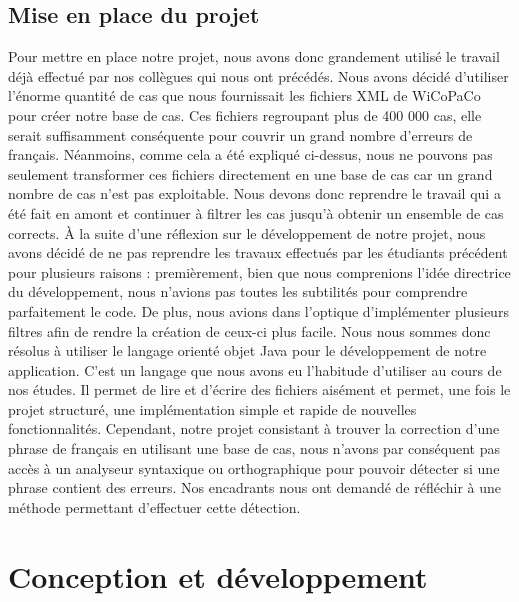 \documentclass{article}
\begin{document}
\subsection{Mise en place du projet}
Pour mettre en place notre projet, nous avons donc grandement utilis\'{e} le travail d\'{e}j\`{a} effectu\'{e} par nos coll\`{e}gues qui nous ont pr\'{e}c\'{e}d\'{e}s. Nous avons d\'{e}cid\'{e} d'utiliser l'\'{e}norme quantit\'{e} de cas que nous fournissait les fichiers XML de WiCoPaCo pour cr\'{e}er notre base de cas. Ces fichiers regroupant plus de 400 000 cas, elle serait suffisamment cons\'{e}quente pour couvrir un grand nombre d'erreurs de fran\c{c}ais. N\'{e}anmoins, comme cela a \'{e}t\'{e} expliqu\'{e} ci-dessus, nous ne pouvons pas seulement transformer ces fichiers directement en une base de cas car un grand nombre de cas n'est pas exploitable. Nous devons donc reprendre le travail qui a \'{e}t\'{e} fait en amont et continuer \`{a} filtrer les cas jusqu'\`{a} obtenir un ensemble de cas corrects.
\newline
\newline
\`{A} la suite d'une r\'{e}flexion sur le d\'{e}veloppement de notre projet, nous avons d\'{e}cid\'{e} de ne pas reprendre les travaux effectu\'{e}s par les \'{e}tudiants pr\'{e}c\'{e}dent pour plusieurs raisons : premi\`{e}rement, bien que nous comprenions l'id\'{e}e directrice du d\'{e}veloppement, nous n'avions pas toutes les subtilit\'{e}s pour comprendre parfaitement le code. De plus, nous avions dans l'optique d'impl\'{e}menter plusieurs filtres afin de rendre la cr\'{e}ation de ceux-ci plus facile. Nous nous sommes donc r\'{e}solus \`{a} utiliser le langage orient\'{e} objet Java pour le d\'{e}veloppement de notre application. C'est un langage que nous avons eu l'habitude d'utiliser au cours de nos \'{e}tudes. Il permet de lire et d'\'{e}crire des fichiers ais\'{e}ment et permet, une fois le projet structur\'{e}, une impl\'{e}mentation simple et rapide de nouvelles fonctionnalit\'{e}s.
\newline
\newline
Cependant, notre projet consistant \`{a} trouver la correction d'une phrase de fran\c{c}ais en utilisant une base de cas, nous n'avons par cons\'{e}quent pas acc\`{e}s \`{a} un analyseur syntaxique ou orthographique pour pouvoir d\'{e}tecter si une phrase contient des erreurs. Nos encadrants nous ont demand\'{e} de r\'{e}fl\'{e}chir \`{a} une m\'{e}thode permettant d'effectuer cette d\'{e}tection.


\section{Conception et d\'{e}veloppement}
\end{document}
